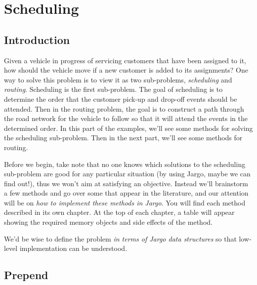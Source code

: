 \part{Scheduling}%
\label{part-scheduling}

\chapter{Introduction}
\label{sched-introduction}

\renewcommand{\thepage}{\arabic{page}}
\setcounter{page}{1}

Given a vehicle in progress of servicing customers that have been assigned to
it, how should the vehicle move if a new customer is added to its assignments?
One way to solve this problem is to view it as two sub-problems,
\emph{scheduling} and \emph{routing}. Scheduling is the first sub-problem. The
goal of scheduling is to determine the order that the customer pick-up and
drop-off events should be attended. Then in the routing problem, the goal is to
construct a path through the road network for the vehicle to follow so that it
will attend the events in the determined order. In this part of the examples,
we'll see some methods for solving the scheduling sub-problem. Then in the next
part, we'll see some methods for routing.

Before we begin, take note that no one knows which solutions to the scheduling
sub-problem are good for any particular situation (by using Jargo, maybe we can
find out!), thus we won't aim at satisfying an objective. Instead we'll
brainstorm a few methods and go over some that appear in the literature, and
our attention will be on \emph{how to implement these methods in Jargo}. You
will find each method described in its own chapter. At the top of each chapter,
a table will appear showing the required memory objects and side effects of the
method.

We'd be wise to define the problem \emph{in terms of Jargo data structures} so
that low-level implementation can be understood.

\chapter{Prepend}
\label{sched-prepend}

